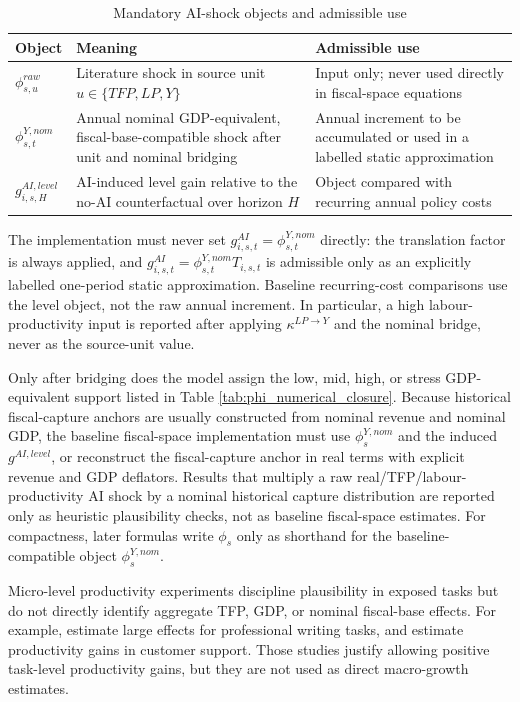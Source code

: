 \documentclass[11pt,a4paper]{article}
\begin{document}
\begin{table}[H]
\centering
\caption{Mandatory AI-shock objects and admissible use}
\label{tab:ai_shock_objects_v17}
\small
\begin{tabular}{p{}p{}p{}}
\toprule
Object & Meaning & Admissible use \\
\midrule
$\phi^{raw}_{s,u}$ & Literature shock in source unit $u\in\{TFP,LP,Y\}$ & Input only; never used directly in fiscal-space equations \\
$\phi^{Y,nom}_{s,t}$ & Annual nominal GDP-equivalent, fiscal-base-compatible shock after unit and nominal bridging & Annual increment to be accumulated or used in a labelled static approximation \\
$g^{AI,level}_{i,s,H}$ & AI-induced level gain relative to the no-AI counterfactual over horizon $H$ & Object compared with recurring annual policy costs \\
\bottomrule
\end{tabular}
\end{table}
\noindent The implementation must never set $g^{AI}_{i,s,t}=\phi^{Y,nom}_{s,t}$ directly: the translation factor is always applied, and $g^{AI}_{i,s,t}=\phi^{Y,nom}_{s,t}T_{i,s,t}$ is admissible only as an explicitly labelled one-period static approximation. Baseline recurring-cost comparisons use the level object, not the raw annual increment. In particular, a high labour-productivity input is reported after applying $\kappa^{LP\to Y}$ and the nominal bridge, never as the source-unit value.

Only after bridging does the model assign the low, mid, high, or stress GDP-equivalent support listed in Table \ref{tab:phi_numerical_closure}.
Because historical fiscal-capture anchors are usually constructed from nominal revenue and nominal GDP, the baseline fiscal-space implementation must use $\phi^{Y,nom}_s$ and the induced $g^{AI,level}$, or reconstruct the fiscal-capture anchor in real terms with explicit revenue and GDP deflators. Results that multiply a raw real/TFP/labour-productivity AI shock by a nominal historical capture distribution are reported only as heuristic plausibility checks, not as baseline fiscal-space estimates. For compactness, later formulas write $\phi_s$ only as shorthand for the baseline-compatible object $\phi^{Y,nom}_s$.

Micro-level productivity experiments discipline plausibility in exposed tasks but do not directly identify aggregate TFP, GDP, or nominal fiscal-base effects. For example, \citet{noy2023experimental} estimate large effects for professional writing tasks, and \citet{brynjolfsson2023generative} estimate productivity gains in customer support. Those studies justify allowing positive task-level productivity gains, but they are not used as direct macro-growth estimates.
\end{document}
